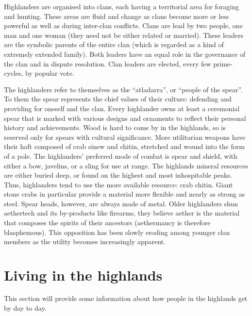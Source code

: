 \documentclass[a4paper,11pt,oneside]{book}
\begin{document}
Highlanders are organised into clans, each having a territorial area for foraging and hunting. These areas are fluid and change as clans become more or less powerful as well as during inter-clan conflicts. Clans are lead by two people, one man and one woman (they need not be either related or married). These leaders are the symbolic parents of the entire clan (which is regarded as a kind of extremely extended family). Both leaders have an equal role in the governance of the clan and in dispute resolution. Clan leaders are elected, every few prime-cycles, by popular vote.  

The highlanders refer to themselves as the ``atladarra'', or ``people of the spear''. To them the spear represents the chief values of their culture: defending and providing for oneself and the clan. Every highlander owns at least a ceremonial spear that is marked with various designs and ornaments to reflect their personal history and achievements. Wood is hard to come by in the highlands, so is reserved only for spears with cultural significance. More utilitarian weapons have their haft composed of crab sinew and chitin, stretched and wound into the form of a pole. The highlanders' preferred mode of combat is spear and shield, with either a bow, javelins, or a sling for use at range. The highlands mineral resources are either buried deep, or found on the highest and most inhospitable peaks. Thus, highlanders tend to use the more available resource: crab chitin. Giant stone crabs in particular provide a material more flexible and nearly as strong as steel. Spear heads, however, are always made of metal. Older highlanders shun aethertech and its by-products like firearms, they believe aether is the material that composes the spirits of their ancestors (aethermancy is therefore blasphemous). This opposition has been slowly eroding among younger clan members as the utility becomes increasingly apparent.  



\section{Living in the highlands}
This section will provide some information about how people in the highlands get by day to day.
\end{document}

